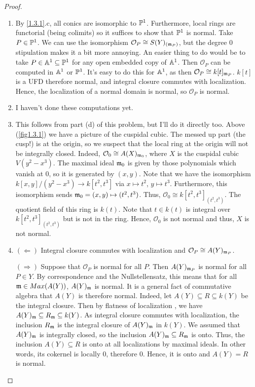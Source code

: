 \begin{proof}
    \begin{enumerate}[label = (\alph*)]
        \item By \ref{1.3.1}.c, all conics are isomorphic to $\P^1$. Furthermore, local rings are functorial (being colimits) so it suffices to show that $\P^1$ is normal. Take $P \in \P^1$. We can use the isomorphism $\mathcal O_P \cong S(Y)_{(\m_P)}$, but the degree 0 stipulation makes it a bit more annoying. An easier thing to do would be to take $P \in \A^1 \subseteq \P^1$ for any open embedded copy of $\A^1$. Then $\mathcal O_P$ can be computed in $\A^1$ or $\P^1$. It's easy to do this for $\A^1$, as then $\mathcal O_P \cong k[t]_{\m_P}$. $k[t]$ is a UFD therefore normal, and integral closure commutes with localization. Hence, the localization of a normal domain is normal, so $\mathcal O_P$ is normal.

        \item I haven't done these computations yet.

        \item This follows from part (d) of this problem, but I'll do it directly too. Above (\ref{fig1.3.1}) we have a picture of the cuspidal cubic. The messed up part (the cusp!) is at the origin, so we suspect that the local ring at the origin will not be integrally closed. Indeed, $\mathcal O_0 \cong A(X)_{\m_0}$, where $X$ is the cuspidal cubic $V(y^2 - x^3)$. The maximal ideal $\m_0$ is given by those polynomials which vanish at $0$, so it is generated by $(x, y)$. Note that we have the isomorphism $k[x, y]/(y^2 - x^3) \longrightarrow k[t^2, t^3]$ via $x \mapsto t^2$, $y \mapsto t^3$. Furthermore, this isomorphism sends $\m_0 = (x, y) \mapsto (t^2, t^3)$. Thus, $\mathcal O_0 \cong k[t^2, t^3]_{(t^2, t^3)}$. The quotient field of this ring is $k(t)$. Note that $t \in k(t)$ is integral over $k[t^2, t^3]_{(t^2, t^3)}$ but is not in the ring. Hence, $\mathcal O_0$ is not normal and thus, $X$ is not normal.

        \item $(\Longleftarrow)$ Integral closure commutes with localization and $\mathcal O_P \cong A(Y)_{\m_P}$.

        $(\Longrightarrow)$ Suppose that $\mathcal O_P$ is normal for all $P$. Then $A(Y)_{\m_P}$ is normal for all $P \in Y$. By correspondence and the Nullstellensatz, this means that for all $\m \in Max(A(Y))$, $A(Y)_\m$ is normal. It is a general fact of commutative algebra that $A(Y)$ is therefore normal. Indeed, let $A(Y) \subseteq R \subseteq k(Y)$ be the integral closure. Then by flatness of localization , we have $A(Y)_\m \subseteq R_\m \subseteq k(Y)$. As integral closure commutes with localization, the inclusion $R_\m$ is the integral closure of $A(Y)_\m$ in $k(Y)$. We assumed that $A(Y)_\m$ is integrally closed, so the inclusion $A(Y)_\m \subseteq R_\m$ is onto. Thus, the inclusion $A(Y) \subseteq R$ is onto at all localizations by maximal ideals. In other words, its cokernel is locally $0$, therefore $0$. Hence, it is onto and $A(Y) = R$ is normal.


\end{enumerate}
\end{proof}
